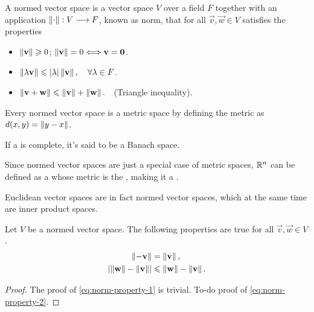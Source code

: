 \begin{defn}\label{def:normed-vector-space}
    A normed vector space is a vector space $V$ over a field $F$ together with an application $\left\Vert \cdot \right\Vert : V\longrightarrow F$, 
    known as norm, that for all $\vec{v}, \vec{w}\in V$ satisfies the properties
\begin{itemize}[itemsep = -2pt]
\item $\left\Vert \mathbf{v} \right\Vert \geqslant 0$; $\left\Vert \mathbf{v} \right\Vert = 0\Longleftrightarrow \mathbf{v} = \mathbf{0}$.
\item $\left\Vert \lambda\mathbf{v} \right\Vert\leqslant\abs{\lambda}\left\Vert \mathbf{v} \right\Vert,\quad\forall\lambda\in F$.
\item $\left\Vert \mathbf{v} + \mathbf{w} \right\Vert \leqslant \left\Vert \mathbf{v} \right\Vert + \left\Vert \mathbf{w} \right\Vert.\quad$(Triangle inequality).
\end{itemize}
\end{defn}

\begin{prop}
Every normed vector space is a metric space by defining the metric as $d(x, y) = \left\Vert y - x \right\Vert$. 
\end{prop}

\begin{note}
    If a  is complete, it's said to be a Banach space.
\end{note}

Since normed vector spaces are just a special case of metric spaces, $\Rtn$ can be defined as a 
whose metric is the , making it a .

\begin{note}
    Euclidean vector spaces are in fact normed vector spaces, which at the same time are inner product spaces.
\end{note}

\begin{prop}
    Let $V$ be a normed vector space. The following properties are true for all $\vec{v}, \vec{w}\in V$.
    \begin{align}
        \left\Vert -\mathbf{v} \right\Vert &= \left\Vert \mathbf{v} \right\Vert, \label{eq:norm-property-1} \\
        \abs{\left\Vert \mathbf{w} \right\Vert - \left\Vert \mathbf{v} \right\Vert} &\leqslant \left\Vert \mathbf{w} \right\Vert - \left\Vert \mathbf{v} \right\Vert. \label{eq:norm-property-2}
    \end{align}
\end{prop}

\begin{proof}
    The proof of \eqref{eq:norm-property-1} is trivial. To-do proof of \eqref{eq:norm-property-2}.
\end{proof}

